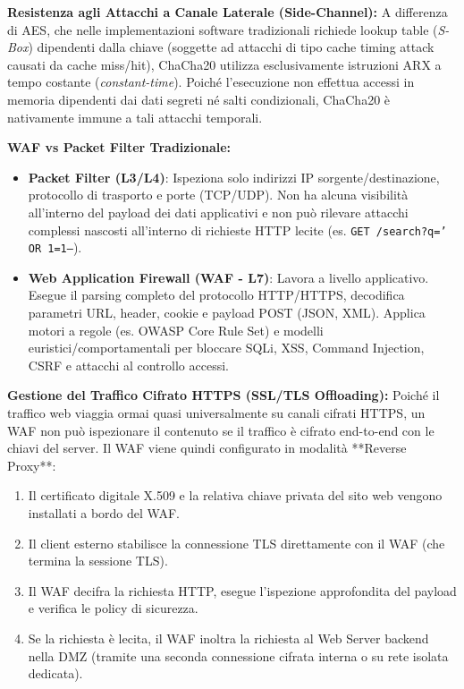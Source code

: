 \documentclass[11pt,a4paper]{article}
\begin{document}
\begin{solutionbox}
\textbf{Resistenza agli Attacchi a Canale Laterale (Side-Channel):}
A differenza di AES, che nelle implementazioni software tradizionali richiede lookup table (\textit{S-Box}) dipendenti dalla chiave (soggette ad attacchi di tipo cache timing attack causati da cache miss/hit), ChaCha20 utilizza esclusivamente istruzioni ARX a tempo costante (\textit{constant-time}). Poich\'e l'esecuzione non effettua accessi in memoria dipendenti dai dati segreti n\'e salti condizionali, ChaCha20 \`e nativamente immune a tali attacchi temporali.
\end{solutionbox}

\begin{solutionbox}
\textbf{WAF vs Packet Filter Tradizionale:}
\begin{itemize}
    \item \textbf{Packet Filter (L3/L4)}: Ispeziona solo indirizzi IP sorgente/destinazione, protocollo di trasporto e porte (TCP/UDP). Non ha alcuna visibilit\`a all'interno del payload dei dati applicativi e non pu\`o rilevare attacchi complessi nascosti all'interno di richieste HTTP lecite (es. \texttt{GET /search?q=' OR 1=1--}).
    \item \textbf{Web Application Firewall (WAF - L7)}: Lavora a livello applicativo. Esegue il parsing completo del protocollo HTTP/HTTPS, decodifica parametri URL, header, cookie e payload POST (JSON, XML). Applica motori a regole (es. OWASP Core Rule Set) e modelli euristici/comportamentali per bloccare SQLi, XSS, Command Injection, CSRF e attacchi al controllo accessi.
\end{itemize}

\textbf{Gestione del Traffico Cifrato HTTPS (SSL/TLS Offloading):}
Poich\'e il traffico web viaggia ormai quasi universalmente su canali cifrati HTTPS, un WAF non pu\`o ispezionare il contenuto se il traffico \`e cifrato end-to-end con le chiavi del server. Il WAF viene quindi configurato in modalit\`a **Reverse Proxy**:
\begin{enumerate}
    \item Il certificato digitale X.509 e la relativa chiave privata del sito web vengono installati a bordo del WAF.
    \item Il client esterno stabilisce la connessione TLS direttamente con il WAF (che termina la sessione TLS).
    \item Il WAF decifra la richiesta HTTP, esegue l'ispezione approfondita del payload e verifica le policy di sicurezza.
    \item Se la richiesta \`e lecita, il WAF inoltra la richiesta al Web Server backend nella DMZ (tramite una seconda connessione cifrata interna o su rete isolata dedicata).
\end{enumerate}


\end{solutionbox}
\end{document}
